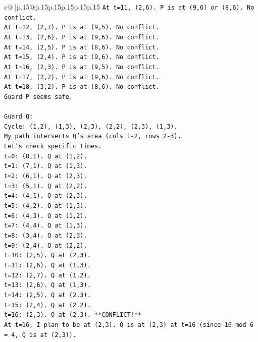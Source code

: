 \documentclass{article}
\begin{document}
{\begin{supertabular}{c@{$\;$}|p{.15\linewidth}@{}p{.15\linewidth}p{.15\linewidth}p{.15\linewidth}p{.15\linewidth}p{.15\linewidth}}
{{{\texttt{At t=11, (2,6). P is at (9,6) or (8,6). No conflict.} \\
\texttt{At t=12, (2,7). P is at (9,5). No conflict.} \\
\texttt{At t=13, (2,6). P is at (9,6). No conflict.} \\
\texttt{At t=14, (2,5). P is at (8,6). No conflict.} \\
\texttt{At t=15, (2,4). P is at (9,6). No conflict.} \\
\texttt{At t=16, (2,3). P is at (9,5). No conflict.} \\
\texttt{At t=17, (2,2). P is at (9,6). No conflict.} \\
\texttt{At t=18, (3,2). P is at (8,6). No conflict.} \\
\texttt{Guard P seems safe.} \\
\\ 
\texttt{Guard Q:} \\
\texttt{Cycle: (1,2), (1,3), (2,3), (2,2), (2,3), (1,3).} \\
\texttt{My path intersects Q's area (cols 1{-}2, rows 2{-}3).} \\
\texttt{Let's check specific times.} \\
\texttt{t=0: (8,1). Q at (1,2).} \\
\texttt{t=1: (7,1). Q at (1,3).} \\
\texttt{t=2: (6,1). Q at (2,3).} \\
\texttt{t=3: (5,1). Q at (2,2).} \\
\texttt{t=4: (4,1). Q at (2,3).} \\
\texttt{t=5: (4,2). Q at (1,3).} \\
\texttt{t=6: (4,3). Q at (1,2).} \\
\texttt{t=7: (4,4). Q at (1,3).} \\
\texttt{t=8: (3,4). Q at (2,3).} \\
\texttt{t=9: (2,4). Q at (2,2).} \\
\texttt{t=10: (2,5). Q at (2,3).} \\
\texttt{t=11: (2,6). Q at (1,3).} \\
\texttt{t=12: (2,7). Q at (1,2).} \\
\texttt{t=13: (2,6). Q at (1,3).} \\
\texttt{t=14: (2,5). Q at (2,3).} \\
\texttt{t=15: (2,4). Q at (2,2).} \\
\texttt{t=16: (2,3). Q at (2,3). **CONFLICT!**} \\
\texttt{At t=16, I plan to be at (2,3). Q is at (2,3) at t=16 (since 16 mod 6 = 4, Q is at (2,3)).} \\
}}}
\end{supertabular}}
\end{document}
